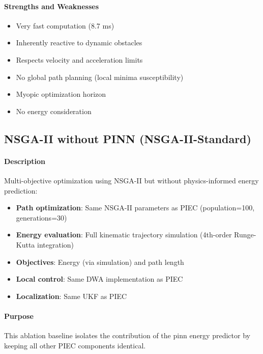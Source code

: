 \paragraph{Strengths and Weaknesses}
\begin{itemize}
    \item[\textcolor{green}{+}] Very fast computation (8.7 ms)
    \item[\textcolor{green}{+}] Inherently reactive to dynamic obstacles
    \item[\textcolor{green}{+}] Respects velocity and acceleration limits
    \item[\textcolor{red}{--}] No global path planning (local minima susceptibility)
    \item[\textcolor{red}{--}] Myopic optimization horizon
    \item[\textcolor{red}{--}] No energy consideration
\end{itemize}

\subsection{NSGA-II without PINN (NSGA-II-Standard)}

\paragraph{Description}
Multi-objective optimization using NSGA-II but without physics-informed energy prediction:
\begin{itemize}
    \item \textbf{Path optimization}: Same NSGA-II parameters as PIEC (population=100, generations=30)
    \item \textbf{Energy evaluation}: Full kinematic trajectory simulation (4th-order Runge-Kutta integration)
    \item \textbf{Objectives}: Energy (via simulation) and path length
    \item \textbf{Local control}: Same DWA implementation as PIEC
    \item \textbf{Localization}: Same UKF as PIEC
\end{itemize}

\paragraph{Purpose}
This ablation baseline isolates the contribution of the \acrshort{pinn} energy predictor by keeping all other PIEC components identical.

